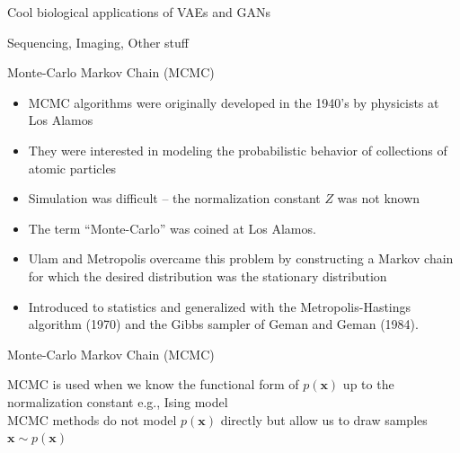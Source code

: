 \documentclass{beamer}					%
\begin{document}
\begin{frame}{Cool biological applications of VAEs and GANs}

Sequencing, Imaging, Other stuff

\end{frame}


\begin{frame}{Monte-Carlo Markov Chain (MCMC)}

\begin{itemize}

\item MCMC algorithms were originally developed in the 1940’s by physicists at
Los Alamos

\item They were interested in modeling the probabilistic behavior of collections of
atomic particles

\item Simulation was difficult – the normalization constant $Z$ was not known

\item The term “Monte-Carlo” was coined at Los Alamos.

\item Ulam and Metropolis overcame this problem by constructing a Markov chain
for which the desired distribution was the stationary distribution

\item Introduced to statistics and generalized with the Metropolis-Hastings
algorithm (1970) and the Gibbs sampler of Geman and Geman (1984).
\end{itemize}

\end{frame}

\begin{frame}{Monte-Carlo Markov Chain (MCMC)}

MCMC is used when we know the functional form of $p(\mathbf{x})$ up to the normalization constant e.g., Ising model\\
\vspace{0.1in}
MCMC methods do not model $p(\mathbf{x})$ directly but allow us to draw samples $\mathbf{x} \sim p(\mathbf{x})$

\end{frame}
\end{document}
